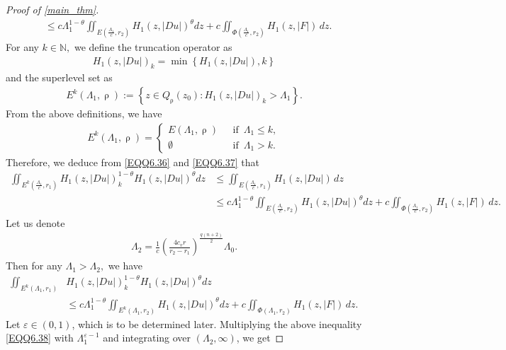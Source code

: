 \documentclass[11pt,oneside, english,reqno,twoside a4paper]{amsart}
\theoremstyle{definition}
\numberwithin{theorem}{section}
\numberwithin{equation}{section}
\begin{document}
\begin{proof}[Proof of \cref{main_thm}]
\begin{align}
    &\leq c\Lambda_1^{1-\theta}\iint_{E\left({\frac{\Lambda_1}{c}, r_2}\right)}H_1(z, |D u|)^\theta dz+ c\iint_{ \Phi \left(\frac{\Lambda_1}{c}, r_2\right)} H_1(z, |F|)\,dz .
\end{align}
For any $k\in \mathbb{N},$ we define the truncation operator as
\begin{align*}
    H_1(z, |D u|)_k =\min \left\{H_1(z, |D u|), k\right\}
\end{align*}
and the superlevel set as 
\begin{align*}
    E^k\left({\Lambda_1, \uprho}\right):=\left\{z\in Q_{\uprho}(z_0) : H_1(z, |D u|)_k > \Lambda_1\right\}.
\end{align*}
From the above definitions, we have 
\begin{align}\label{EQQ6.37}
    E^k\left({\Lambda_1, \uprho}\right)=\begin{cases}
        E\left({\Lambda_1, \uprho}\right)\,\,\,\, &\text{if}\,\,\, \Lambda_1 \leq k,\\
        \emptyset\,\,\,\, &\text{if}\,\,\, \Lambda_1> k.
    \end{cases}
\end{align}
Therefore, we deduce from \eqref{EQQ6.36} and \eqref{EQQ6.37} that 
\begin{align*}
\iint_{E^k\left({\frac{\Lambda_1}{c}, r_1}\right)}H_1(z, |D u|)_k^{1-\theta}H_1(z, |D u|)^\theta dz&\leq \iint_{E\left({\frac{\Lambda_1}{c}, r_1}\right)}H_1(z, |D u|) \, dz \\
&\leq c\Lambda_1^{1-\theta}\iint_{E\left({\frac{\Lambda_1}{c}, r_2}\right)}H_1(z, |D u|)^\theta dz+ c\iint_{ \Phi \left(\frac{\Lambda_1}{c}, r_2\right)} H_1(z, |F|)\,dz .
\end{align*}
Let us denote
\begin{align*}
\Lambda_2=\frac{1}{c}\left(\frac{4 c_v r}{r_2-r_1}\right)^{\frac{q(n+2)}{2}}\Lambda_0.
\end{align*}
Then for any $\Lambda_1 > \Lambda_2,$ we have
\begin{align}\label{EQQ6.38}
\iint_{E^k\left({\Lambda_1, r_1}\right)}&H_1(z, |D u|)_k^{1-\theta}H_1(z, |D u|)^\theta dz\nonumber\\
&\leq c\Lambda_1^{1-\theta}\iint_{E^k\left({\Lambda_1, r_2}\right)}H_1(z, |D u|)^\theta dz+c\iint_{ \Phi \left(\Lambda_1, r_2\right)} H_1(z, |F|)\,dz .
\end{align}
Let $\varepsilon \in (0, 1)$, which is to be determined later. Multiplying the above inequality \eqref{EQQ6.38} with $\Lambda_1^{\varepsilon-1}$ and integrating over $(\Lambda_2, \infty)$, we get

\end{proof}
\end{document}
